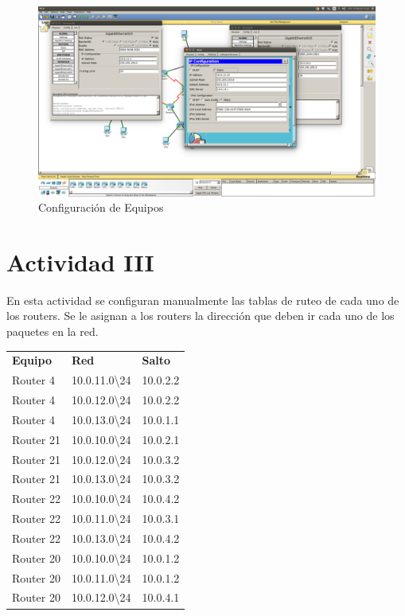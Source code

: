 \documentclass[spanish]{udpreport}
\begin{document}
\begin{figure}[H]
	\centering
	\includegraphics[scale=.25]{imagenes/ips.png}
	\caption{Configuración de Equipos}
	\label{fig:Figura 3.1}
\end{figure}


\section{Actividad III}

En esta actividad se configuran manualmente las tablas de ruteo de cada uno de los routers. Se le asignan a los routers la dirección que deben ir cada uno de los paquetes en la red.

\begin{table}[H]
\centering
\begin{tabular}{p{3cm}|p{4cm}|p{4cm}}
\textbf{Equipo} & \textbf{Red} & \textbf{Salto} \\
       Router 4 & 10.0.11.0\textbackslash 24& 10.0.2.2 \\
       Router 4 & 10.0.12.0\textbackslash 24& 10.0.2.2 \\
       Router 4 & 10.0.13.0\textbackslash 24& 10.0.1.1 \\
       Router 21 & 10.0.10.0\textbackslash 24& 10.0.2.1 \\
       Router 21 & 10.0.12.0\textbackslash 24& 10.0.3.2 \\
       Router 21 & 10.0.13.0\textbackslash 24& 10.0.3.2 \\
       Router 22 & 10.0.10.0\textbackslash 24& 10.0.4.2 \\
       Router 22 & 10.0.11.0\textbackslash 24& 10.0.3.1 \\
       Router 22 & 10.0.13.0\textbackslash 24& 10.0.4.2 \\
       Router 20 & 10.0.10.0\textbackslash 24& 10.0.1.2 \\
       Router 20 & 10.0.11.0\textbackslash 24& 10.0.1.2 \\
       Router 20 & 10.0.12.0\textbackslash 24& 10.0.4.1 \\
\end{tabular}
\end{table}
\end{document}
